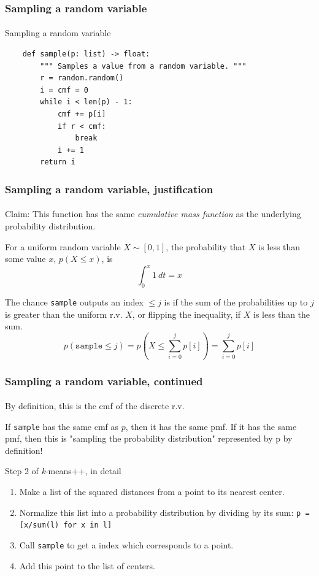 \documentclass{beamer}                             %
\begin{document}
\begin{frame}[fragile]
\frametitle{Sampling a random variable}
\framesubtitle{}
\begin{algorithm}[H]
  \caption{Sampling a random variable}
  \begin{verbatim}
    def sample(p: list) -> float:
        """ Samples a value from a random variable. """
        r = random.random()
        i = cmf = 0
        while i < len(p) - 1:
            cmf += p[i]
            if r < cmf:
                break
            i += 1
        return i
  \end{verbatim}
\end{algorithm}
\end{frame}

\begin{frame}
\frametitle{Sampling a random variable, justification}
\framesubtitle{}
Claim: This function has the same \textit{cumulative mass function}
as the underlying probability distribution. \pause

For a uniform random variable \( X \sim [0, 1] \), the probability that
\( X \) is less than some value \( x \), \( p(X \leq x) \), is 
\[ \int^{x}_0 1 \ dt = x \] \pause

The chance \texttt{sample} outputs an index \( \leq j \) is if the sum
of the probabilities up to \( j \) is greater than the uniform r.v. \( X \),
or flipping the inequality, if \( X \) is less than the sum. 
\[p(\texttt{sample} \leq j) =
p(X \leq \sum^{j}_{i = 0} p[i]) = \sum^{j}_{i = 0} p[i] \]  \pause
\end{frame}

\begin{frame}[fragile]
\frametitle{Sampling a random variable, continued}
\framesubtitle{}
By definition, this is the cmf of the discrete r.v. \pause

If \texttt{sample} has the same cmf as \( p \), then it has the same pmf.
If it has the same pmf, then this is "sampling the probability distribution"
represented by p by definition! \pause

\begin{block}{Step 2 of \textit{k}-means++, in detail} 
  \begin{enumerate}
    \item Make a list of the squared distances
      from a point to its nearest center.
    \item Normalize this list into a probability distribution
      by dividing by its sum: \texttt{p = [x/sum(l) for x in l]}
    \item Call \texttt{sample} to get a index which corresponds to a point.
    \item Add this point to the list of centers.
  \end{enumerate}
\end{block}
\end{frame}
\end{document}
